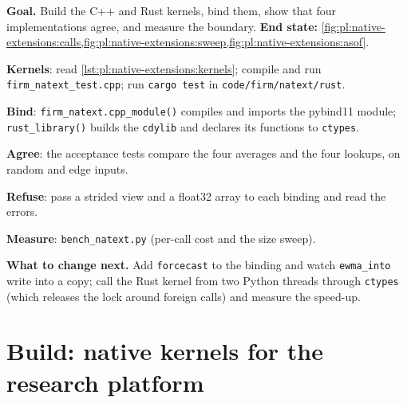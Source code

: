 \begin{tutorial}
\textbf{Goal.} Build the C++ and Rust kernels, bind them, show that four implementations agree, and measure the boundary.
\textbf{End state:} \cref{fig:pl:native-extensions:calls,fig:pl:native-extensions:sweep,fig:pl:native-extensions:asof}.
\begin{tutsteps}
\item \textbf{Kernels}: read \cref{lst:pl:native-extensions:kernels}; compile and run \texttt{firm\_natext\_test.cpp}; run
\texttt{cargo test} in \texttt{code/firm/natext/rust}.
\item \textbf{Bind}: \texttt{firm\_natext.cpp\_module()} compiles and imports the pybind11 module;
\texttt{rust\_library()} builds the \texttt{cdylib} and declares its functions to \texttt{ctypes}.
\item \textbf{Agree}: the acceptance tests compare the four averages and the four lookups, on random and edge inputs.
\item \textbf{Refuse}: pass a strided view and a float32 array to each binding and read the errors.
\item \textbf{Measure}: \texttt{bench\_natext.py} (per-call cost and the size sweep).
\end{tutsteps}
\textbf{What to change next.} Add \texttt{forcecast} to the binding and watch \texttt{ewma\_into} write into a copy; call the Rust kernel
from two Python threads through \texttt{ctypes} (which releases the lock around foreign calls) and measure the speed-up.
\end{tutorial}

\section{Build: native kernels for the research platform}\label{bld:pl:native-extensions:natext}

